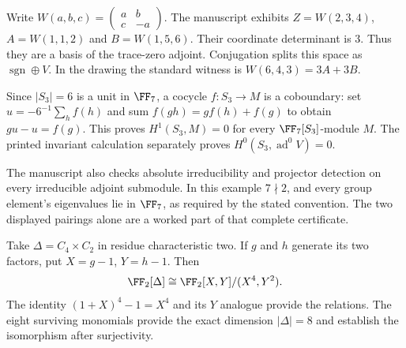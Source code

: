 
Write $W(a,b,c)=\left(\begin{smallmatrix}a&b\\c&-a\end{smallmatrix}\right)$. The manuscript exhibits $Z=W(2,3,4)$, $A=W(1,1,2)$ and $B=W(1,5,6)$. Their coordinate determinant is $3$. Thus they are a basis of the trace-zero adjoint. Conjugation splits this space as $\operatorname{sgn}\oplus V$. In the drawing the standard witness is $W(6,4,3)=3A+3B$.

Since $|S_3|=6$ is a unit in $\FF_7$, a cocycle $f:S_3\to M$ is a coboundary: set $u=-6^{-1}\sum_h f(h)$ and sum $f(gh)=g f(h)+f(g)$ to obtain $gu-u=f(g)$. This proves $H^1(S_3,M)=0$ for every $\FF_7[S_3]$-module $M$. The printed invariant calculation separately proves $H^0(S_3,\operatorname{ad}^0V)=0$.

The manuscript also checks absolute irreducibility and projector detection on every irreducible adjoint submodule. In this example $7\nmid2$, and every group element's eigenvalues lie in $\FF_7$, as required by the stated convention. The two displayed pairings alone are a worked part of that complete certificate.


Take $\Delta=C_4\times C_2$ in residue characteristic two. If $g$ and $h$ generate its two factors, put $X=g-1$, $Y=h-1$. Then
\[
\FF_2[\Delta]\cong\FF_2[X,Y]/(X^4,Y^2).
\]
The identity $(1+X)^4-1=X^4$ and its $Y$ analogue provide the relations. The eight surviving monomials provide the exact dimension $|\Delta|=8$ and establish the isomorphism after surjectivity.



